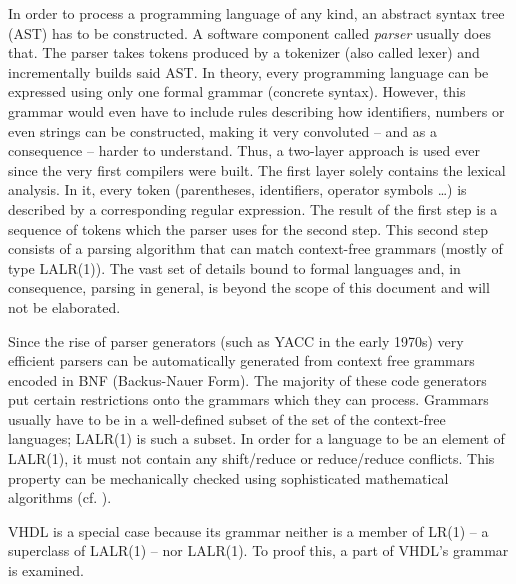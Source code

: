 
In order to process a programming language of any kind, an abstract syntax
tree (AST) has to be constructed. A software component
called \emph{parser} usually does that. The parser takes tokens
produced by a tokenizer
(also called lexer) and incrementally builds said AST. In theory,
every programming language can be expressed using only one formal
grammar (concrete syntax).
However, this grammar would even have to include rules
describing how identifiers, numbers or even strings can be
constructed, making it very convoluted -- and as a consequence -- harder to
understand. Thus, a two-layer approach is used ever since the very
first compilers were built. The first layer solely contains the lexical
analysis. In it, every token (parentheses, identifiers, operator
symbols \ldots) is described by a corresponding regular
expression. The result of the first step is a sequence of tokens
which the parser uses for the second step.
This second step consists of a parsing algorithm that can match
context-free grammars (mostly of type LALR(1)). The vast set of %
details bound to formal languages and, in consequence, parsing in
general, is beyond the scope of this document and will not be elaborated.

Since the rise of parser generators (such as YACC in the early 1970s)
very efficient parsers can be automatically generated from context
free grammars
encoded in BNF (Backus-Nauer Form). The majority of these code generators
put certain restrictions onto the grammars which they can
process. Grammars usually have to be in a well-defined subset of the
set of the context-free languages; LALR(1) is such a subset. In order
for a language to be an element of LALR(1), it must not contain any
shift/reduce or reduce/reduce conflicts. This property can be
mechanically checked using sophisticated mathematical algorithms
(cf. \cite{LRKNUTH}).

VHDL is a special case because its grammar neither is a member of LR(1)
-- a superclass of LALR(1) -- nor LALR(1). To proof this, a part of
VHDL's grammar is examined.


